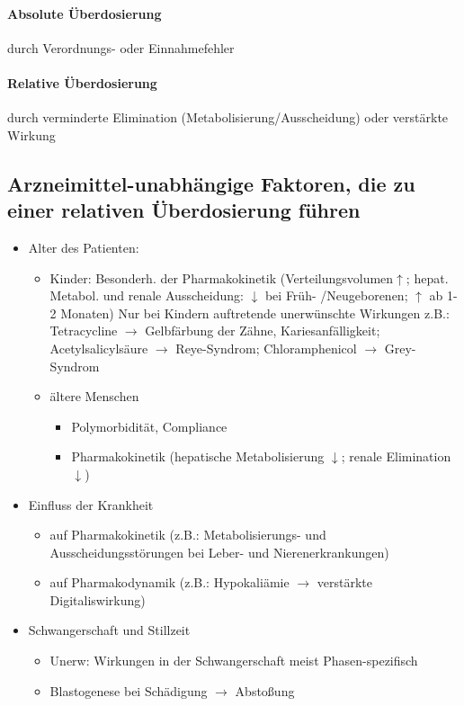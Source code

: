 \documentclass[10pt,a4paper]{report}
\begin{document}
\paragraph{Absolute Überdosierung} durch Verordnungs- oder Einnahmefehler
\paragraph{Relative Überdosierung} durch verminderte Elimination (Metabolisierung/Ausscheidung) oder verstärkte Wirkung
\subsection{Arzneimittel-unabhängige Faktoren, die zu einer relativen Überdosierung führen}
\begin{itemize}
	\item Alter des Patienten: 
	\begin{itemize}
		\item Kinder: Besonderh. der Pharmakokinetik (Verteilungsvolumen$\uparrow$; hepat. Metabol. und renale Ausscheidung: $\downarrow$ bei Früh- /Neugeborenen; $\uparrow$ ab 1-2 Monaten) Nur bei Kindern auftretende unerwünschte Wirkungen	z.B.: Tetracycline $\rightarrow$ Gelbfärbung der Zähne, Kariesanfälligkeit;	Acetylsalicylsäure $\rightarrow$ Reye-Syndrom; Chloramphenicol $\rightarrow$ Grey-Syndrom
		\item ältere Menschen
		\begin{itemize}
			\item Polymorbidität, Compliance
			\item Pharmakokinetik (hepatische Metabolisierung $\downarrow$; renale Elimination $\downarrow$)
		\end{itemize}
	\end{itemize}	 
	\item Einfluss der Krankheit
	\begin{itemize}
		\item auf Pharmakokinetik (z.B.: Metabolisierungs- und Ausscheidungsstörungen 
		bei Leber- und Nierenerkrankungen)
		\item auf Pharmakodynamik (z.B.: Hypokaliämie $\rightarrow$ verstärkte Digitaliswirkung)
	\end{itemize}
	\item Schwangerschaft und Stillzeit
	\begin{itemize}
		\item Unerw: Wirkungen in der Schwangerschaft meist Phasen-spezifisch
		\item Blastogenese  bei Schädigung $\rightarrow$ Abstoßung

\end{itemize}
\end{itemize}
\end{document}

